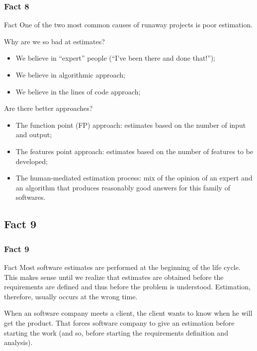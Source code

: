 \documentclass{beamer}
\begin{document}
\begin{frame}
    \frametitle{Fact 8}
    \begin{block}{Fact}
    One of the two most common causes of runaway projects is poor estimation.
    \end{block}
    \pause

    Why are we so bad at estimates?
    \begin{itemize}
        \item We believe in \enquote{expert} people (\enquote{I've been there
        and done that!});
        \pause
        \item We believe in algorithmic approach;
        \pause
        \item We believe in the lines of code approach;
    \end{itemize}
    \bigskip

    \pause
    Are there better approaches?
    \begin{itemize}
        \item The function point (FP) approach: estimates based on the number of
        input and output;
        \pause
        \item The features point approach: estimates based on the number of
        features to be developed;
        \pause
        \item The human-mediated estimation process: mix of the opinion of an
        expert and an algorithm that produces reasonably good answers for this
        family of softwares.
    \end{itemize}
\end{frame}

\subsection{Fact 9}
\begin{frame}
    \frametitle{Fact 9}
    \begin{block}{Fact}
    Most software estimates are performed at the beginning of the life cycle.
    This makes sense until we realize that estimates are obtained before the
    requirements are defined and thus before the problem is understood.
    Estimation, therefore, usually occurs at the wrong time.
    \end{block}
    \pause

    When an software company meets a client, the client wants to know when he
    will get the product. That forces software company to give an estimation
    before starting the work (and so, before starting the requirements
    definition and analysis).
\end{frame}
\end{document}
